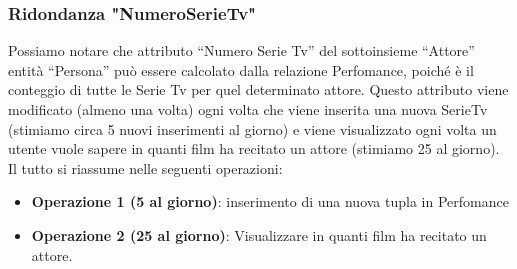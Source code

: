 \documentclass[10pt,a4paper]{article}
\begin{document}
\subsubsection{Ridondanza "NumeroSerieTv"}
Possiamo notare che attributo “Numero Serie Tv” del sottoinsieme “Attore” entità “Persona” può essere calcolato dalla relazione Perfomance, poiché è il conteggio di tutte le Serie Tv per quel determinato attore.
Questo attributo viene modificato (almeno una volta) ogni volta che viene inserita una nuova SerieTv (stimiamo circa 5 nuovi inserimenti al giorno)
e viene visualizzato ogni volta un utente vuole sapere in quanti film ha recitato un attore (stimiamo 25 al giorno).
Il tutto si riassume nelle seguenti operazioni:
\begin{itemize}
    \item \textbf{Operazione 1 (5 al giorno)}: inserimento di una nuova tupla in Perfomance
    \item \textbf{Operazione 2 (25 al giorno)}: Visualizzare in quanti film ha recitato un attore.
\end{itemize}
\end{document}
